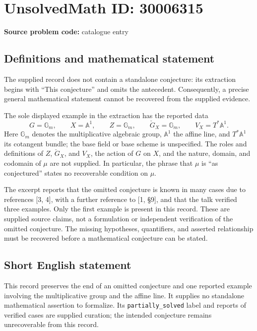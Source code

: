 \documentclass[11pt]{article}
\begin{document}
\section*{UnsolvedMath ID: 30006315}
\textbf{Source problem code:} catalogue entry
\subsection{Definitions and mathematical statement}
The supplied record does not contain a standalone conjecture: its extraction begins with ``This conjecture'' and omits the antecedent. Consequently, a precise general mathematical statement cannot be recovered from the supplied evidence.

The sole displayed example in the extraction has the reported data
\[
G=\mathbb{G}_m,\qquad X=\mathbb{A}^{1},\qquad Z=\mathbb{G}_m,\qquad \check{G}_X=\mathbb{G}_m,\qquad V_X=T^{*}\mathbb{A}^{1}.
\]
Here \(\mathbb{G}_m\) denotes the multiplicative algebraic group, \(\mathbb{A}^{1}\) the affine line, and \(T^{*}\mathbb{A}^{1}\) its cotangent bundle; the base field or base scheme is unspecified. The roles and definitions of \(Z\), \(\check{G}_X\), and \(V_X\), the action of \(G\) on \(X\), and the nature, domain, and codomain of \(\mu\) are not supplied. In particular, the phrase that \(\mu\) is ``as conjectured'' states no recoverable condition on \(\mu\).

The excerpt reports that the omitted conjecture is known in many cases due to references [3, 4], with a further reference to [1, \S 9], and that the talk verified three examples. Only the first example is present in this record. These are supplied source claims, not a formulation or independent verification of the omitted conjecture. The missing hypotheses, quantifiers, and asserted relationship must be recovered before a mathematical conjecture can be stated.
\subsection{Short English statement}
This record preserves the end of an omitted conjecture and one reported example involving the multiplicative group and the affine line. It supplies no standalone mathematical assertion to formalize. Its \texttt{partially\_solved} label and reports of verified cases are supplied curation; the intended conjecture remains unrecoverable from this record.
\end{document}
